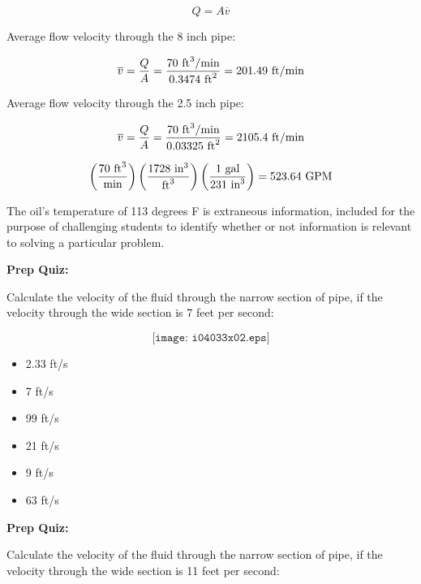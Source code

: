 





$$Q = A \overline{v}$$

Average flow velocity through the 8 inch pipe:

$$\overline{v} = {Q \over A} = {70 \hbox{ ft}^3/\hbox{min} \over 0.3474 \hbox{ ft}^2} = 201.49 \hbox{ ft/min}$$

\vskip 10pt

Average flow velocity through the 2.5 inch pipe:

$$\overline{v} = {Q \over A} = {70 \hbox{ ft}^3/\hbox{min} \over 0.03325 \hbox{ ft}^2} = 2105.4 \hbox{ ft/min}$$

\vskip 10pt

$$\left({70 \hbox{ ft}^3 \over \hbox{min}}\right) \left({1728 \hbox{ in}^3 \over \hbox{ft}^3}\right) \left({1 \hbox{ gal} \over 231 \hbox{ in}^3} \right) = 523.64 \hbox{ GPM}$$

\vskip 10pt

The oil's temperature of 113 degrees F is extraneous information, included for the purpose of challenging students to identify whether or not information is relevant to solving a particular problem.








\vfil \eject

\noindent
{\bf Prep Quiz:}

Calculate the velocity of the fluid through the narrow section of pipe, if the velocity through the wide section is 7 feet per second:

$$\texttt{[image: i04033x02.eps]}$$

\begin{itemize}
\item{} 2.33 ft/s
\vskip 5pt 
\item{} 7 ft/s
\vskip 5pt 
\item{} 99 ft/s
\vskip 5pt 
\item{} 21 ft/s
\vskip 5pt 
\item{} 9 ft/s 
\vskip 5pt 
\item{} 63 ft/s
\end{itemize}

\vfil \eject

\noindent
{\bf Prep Quiz:}

Calculate the velocity of the fluid through the narrow section of pipe, if the velocity through the wide section is 11 feet per second:

